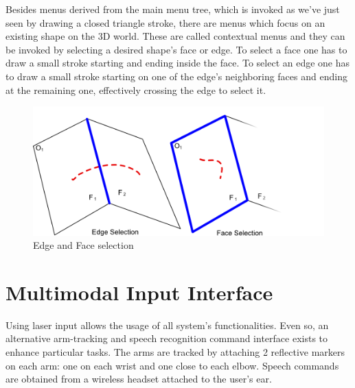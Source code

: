Besides menus derived from the main menu tree, which is invoked as we've just seen by drawing a closed triangle stroke,
there are menus which focus on an existing shape on the 3D world.
These are called contextual menus and they can be invoked by selecting a desired shape's face or edge.
To select a face one has to draw a small stroke starting and ending inside the face.
To select an edge one has to draw a small stroke starting on one of the edge's neighboring faces and ending at the remaining one,
effectively crossing the edge to select it.


\begin{figure}[ht]
	\centering
		\includegraphics[scale=0.75]{gfx/face-edge-selection.png}
		\caption{Edge and Face selection}
	\label{fig:face-edge-selection}
\end{figure}



\section{Multimodal Input Interface}

Using laser input allows the usage of all system's functionalities.
Even so, an alternative arm-tracking and speech recognition command interface exists to enhance particular tasks.
The arms are tracked by attaching 2 reflective markers on each arm: one on each wrist and one close to each elbow.
Speech commands are obtained from a wireless headset attached to the user's ear.


